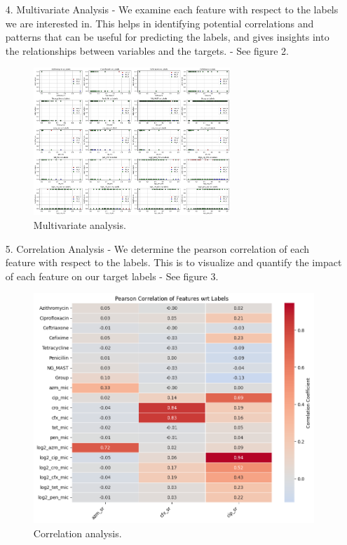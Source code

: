 \documentclass[manuscript,screen,review, nonacm]{acmart}
\begin{document}
\begin{itemize}
    \item[4.] Multivariate Analysis - We examine each feature with respect to the labels we are interested in. This helps in identifying potential correlations and
    patterns that can be useful for predicting the labels, and gives insights into the relationships between variables and the targets. - See figure 2.
            \begin{figure}[H]
                \centering
                \vspace{-10pt}
                \includegraphics[width=0.7\textwidth]{figures/multivar.png}
                \caption{Multivariate analysis.}
                \vspace{-10pt}
            \end{figure}

    \item[5.] Correlation Analysis - We determine the pearson correlation of each feature with respect to the labels. This is to visualize and quantify the impact of each
    feature on our target labels - See figure 3.
            \begin{figure}[H]
                \centering
                \vspace{-15pt}
                \includegraphics[width=1\textwidth]{figures/corr.png}
                \caption{Correlation analysis.}
                \vspace{-15pt}
            \end{figure}


\end{itemize}
\end{document}
